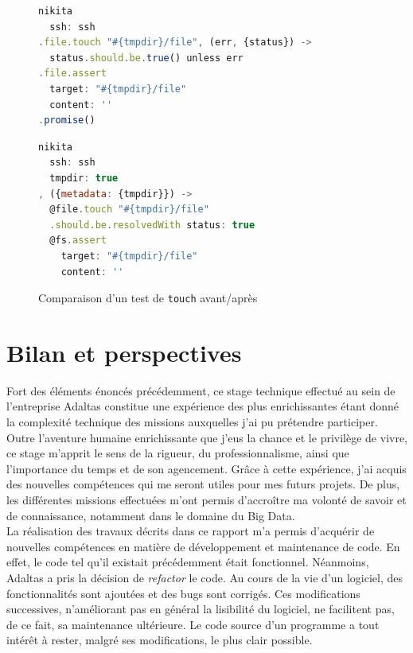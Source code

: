 \documentclass[12pt, french]{report}
\begin{document}
\begin{figure}[H]
\begin{minipage}{0.45\textwidth}
\begin{lstlisting}[language=JavaScript]
nikita
  ssh: ssh
.file.touch "#{tmpdir}/file", (err, {status}) ->
  status.should.be.true() unless err
.file.assert
  target: "#{tmpdir}/file"
  content: ''
.promise()
\end{lstlisting}
\end{minipage}\hfill
\begin{minipage}{0.45\textwidth}
\begin{lstlisting}[language=JavaScript]
nikita
  ssh: ssh
  tmpdir: true
, ({metadata: {tmpdir}}) ->
  @file.touch "#{tmpdir}/file"
  .should.be.resolvedWith status: true
  @fs.assert
    target: "#{tmpdir}/file"
    content: ''
\end{lstlisting}
\end{minipage}\hfill
\centering
\caption{Comparaison d'un test de \texttt{touch} avant/après}
\label{code:testComparison}
\end{figure}

\chapter*{Bilan et perspectives}

Fort des éléments énoncés précédemment, ce stage technique effectué au sein de l’entreprise Adaltas constitue une expérience des plus enrichissantes étant donné la complexité technique des missions auxquelles j'ai pu prétendre participer. Outre l’aventure humaine enrichissante que j’eus la chance et le privilège de vivre, ce stage m’apprit le sens de la rigueur, du professionnalisme, ainsi que l’importance du temps et de son agencement. Grâce à cette expérience, j’ai acquis des nouvelles compétences qui me seront utiles pour mes futurs projets. De plus, les différentes missions effectuées m’ont permis d’accroître ma volonté de savoir et de connaissance, notamment dans le domaine du Big Data.\\

La réalisation des travaux décrits dans ce rapport m'a permis d'acquérir de nouvelles compétences en matière de développement et maintenance de code. En effet, le code tel qu'il existait précédemment était fonctionnel. Néanmoins, Adaltas a pris la décision de \textit{refactor} le code. Au cours de la vie d'un logiciel, des fonctionnalités sont ajoutées et des bugs sont corrigés. Ces modifications successives, n'améliorant pas en général la lisibilité du logiciel, ne facilitent pas, de ce fait, sa maintenance ultérieure. Le code source d'un programme a tout intérêt à rester, malgré ses modifications, le plus clair possible.\\
\end{document}
